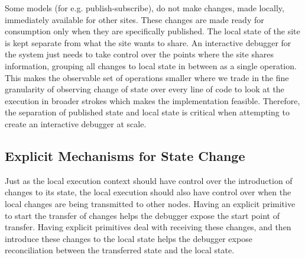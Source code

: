 Some models (for e.g. publish-subscribe), do not make changes, made locally, immediately available for other sites. These changes are made ready for consumption only when they are specifically published. The local state of the site is kept separate from what the site wants to share. An interactive debugger for the system just needs to take control over the points where the site shares information, grouping all changes to local state in between as a single operation. This makes the observable set of operations smaller where we trade in the fine granularity of observing change of state over every line of code to look at the execution in broader strokes which makes the implementation feasible. Therefore, the separation of published state and local state is critical when attempting to create an interactive debugger at scale.

\subsection{Explicit Mechanisms for State Change}
Just as the local execution context should have control over the introduction of changes to its state, the local execution should also have control over when the local changes are being transmitted to other nodes. Having an explicit primitive to start the transfer of changes helps the debugger expose the start point of transfer. Having explicit primitives deal with receiving these changes, and then introduce these changes to the local state helps the debugger expose reconciliation between the transferred state and the local state.
